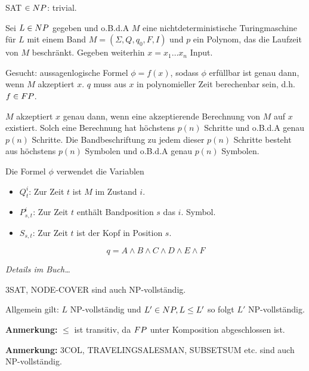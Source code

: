 \begin{beweis}
    
    SAT $\in NP$: trivial.

    Sei $L \in NP$ gegeben und o.B.d.A $M$ eine nichtdeterministische Turingmaschine für $L$ mit einem Band $M = (\Sigma, Q, q_0, F, I)$ und $p$ ein Polynom, das die Laufzeit von $M$ beschränkt.
    Gegeben weiterhin $x = x_1 \dots x_n$ Input.

    Gesucht: aussagenlogische Formel $\phi = f(x)$, sodass $\phi$ erfüllbar ist genau dann, wenn $M$ akzeptiert $x$. $q$ muss aus $x$ in polynomieller Zeit berechenbar sein, d.h. $f \in FP$.

    $M$ akzeptiert $x$ genau dann, wenn eine akzeptierende Berechnung von $M$ auf $x$ existiert. Solch eine Berechnung hat höchstens $p(n)$ Schritte und o.B.d.A genau $p(n)$ Schritte. Die Bandbeschriftung zu jedem dieser $p(n)$ Schritte besteht aus höchstens $p(n)$ Symbolen und o.B.d.A genau $p(n)$ Symbolen.

    Die Formel $\phi$ verwendet die Variablen 
    \begin{itemize}
        \item $Q_t^i$: Zur Zeit $t$ ist $M$ im Zustand $i$.
        \item $P_{s,t}^i$: Zur Zeit $t$ enthält Bandposition $s$ das $i.$ Symbol.
        \item $S_{s,t}$: Zur Zeit $t$ ist der Kopf in Position $s$.
    \end{itemize}

    $$ q = A \land B \land C \land D \land E \land F $$

    \textit{Details im Buch\dots}

\end{beweis}


3SAT, NODE-COVER sind auch NP-vollständig.

Allgemein gilt: $L$ NP-vollständig und $L' \in NP, L \leq L'$ 
so folgt $L'$ NP-vollständig.


\textbf{Anmerkung:}
$\leq$ ist transitiv, da $FP$ unter Komposition abgeschlossen ist.

\textbf{Anmerkung:}
3COL, TRAVELINGSALESMAN, SUBSETSUM etc. sind auch NP-vollständig.












